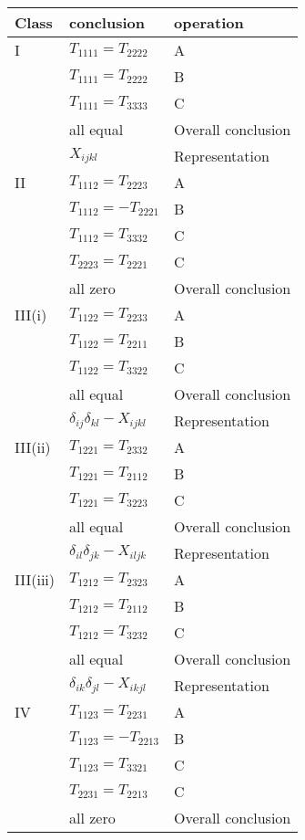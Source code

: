\begin{center}
\begin{tabular}{|l|l|l|}
\hline
Class & conclusion & operation \\
\hline
I & $T_{1111} = T_{2222}$ & A \\
 & $T_{1111} = T_{2222}$ & B \\
 & $T_{1111} = T_{3333}$ & C \\
 & all equal & Overall conclusion \\ 
 & $X_{ijkl}$ & Representation \\ 
\hline
II & $T_{1112} = T_{2223}$ & A \\
 & $T_{1112} = -T_{2221}$ & B \\
 & $T_{1112} = T_{3332}$ & C \\
 & $T_{2223} = T_{2221}$ & C  \\ 
 & all zero & Overall conclusion \\ 
\hline
III(i) & $T_{1122} = T_{2233} $ & A\\ 
 & $T_{1122} = T_{2211} $ & B\\ 
 & $T_{1122} = T_{3322} $ & C\\ 
 & all equal & Overall conclusion \\ 
 & $\delta_{ij}\delta_{kl}-X_{ijkl}$ & Representation \\ 
\hline
III(ii) & $T_{1221}=T_{2332}$ & A \\ 
 & $T_{1221}=T_{2112}$ & B \\ 
 & $T_{1221}=T_{3223}$ & C \\ 
 & all equal & Overall conclusion \\ 
 & $\delta_{il}\delta_{jk}-X_{iljk}$ & Representation \\ 
\hline
III(iii) & $T_{1212}=T_{2323}$ & A  \\ 
 & $T_{1212}=T_{2112}$ & B  \\ 
 & $T_{1212}=T_{3232}$ & C  \\ 
 & all equal & Overall conclusion \\ 
 & $\delta_{ik}\delta_{jl}-X_{ikjl}$ & Representation \\ 
\hline
IV & $T_{1123}=T_{2231}$ & A\\ 
 & $T_{1123}=-T_{2213}$ & B\\ 
 & $T_{1123}=T_{3321}$ & C\\ 
 & $T_{2231}=T_{2213}$ & C\\ 
 & all zero & Overall conclusion \\ 
\hline
\end{tabular}
\end{center}

